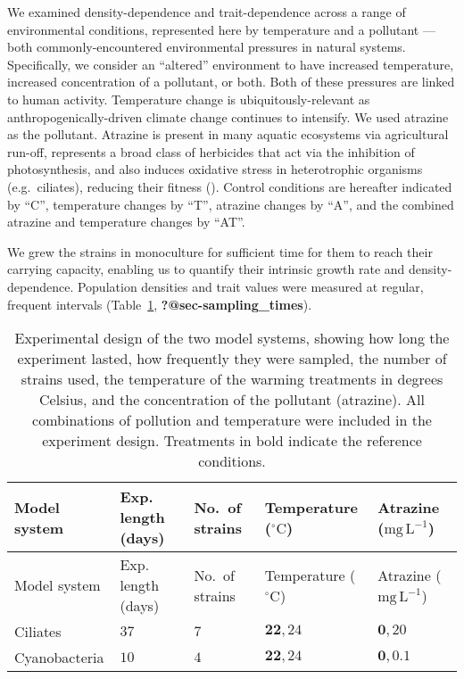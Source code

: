\documentclass[
  letterpaper,
  DIV=11,
  numbers=noendperiod]{scrartcl}
\begin{document}
We examined density-dependence and trait-dependence across a range of
environmental conditions, represented here by temperature and a
pollutant --- both commonly-encountered environmental pressures in
natural systems. Specifically, we consider an ``altered'' environment to
have increased temperature, increased concentration of a pollutant, or
both. Both of these pressures are linked to human activity. Temperature
change is ubiquitously-relevant as anthropogenically-driven climate
change continues to intensify. We used atrazine as the pollutant.
Atrazine is present in many aquatic ecosystems via agricultural run-off,
represents a broad class of herbicides that act via the inhibition of
photosynthesis, and also induces oxidative stress in heterotrophic
organisms (e.g.~ciliates), reducing their fitness
(). Control conditions are
hereafter indicated by ``C'', temperature changes by ``T'', atrazine
changes by ``A'', and the combined atrazine and temperature changes by
``AT''.

We grew the strains in monoculture for sufficient time for them to reach
their carrying capacity, enabling us to quantify their intrinsic growth
rate and density-dependence. Population densities and trait values were
measured at regular, frequent intervals
(Table~\ref{tbl-treatment-table}, \textbf{?@sec-sampling\_times}).

\begin{longtable}[]{@{}lllll@{}}
\caption{Experimental design of the two model systems, showing how long
the experiment lasted, how frequently they were sampled, the number of
strains used, the temperature of the warming treatments in degrees
Celsius, and the concentration of the pollutant (atrazine). All
combinations of pollution and temperature were included in the
experiment design. Treatments in bold indicate the reference
conditions.}\label{tbl-treatment-table}\tabularnewline
\toprule\noalign{}
Model system & Exp. length (days) & No.~of strains & Temperature
(\(\mathrm{^\circ C}\)) & Atrazine (\(\mathrm{mg\,L}^{-1}\)) \\
\midrule\noalign{}
\endfirsthead
\toprule\noalign{}
Model system & Exp. length (days) & No.~of strains & Temperature
(\(\mathrm{^\circ C}\)) & Atrazine (\(\mathrm{mg\,L}^{-1}\)) \\
\midrule\noalign{}
\endhead
\bottomrule\noalign{}
\endlastfoot
Ciliates & \(37\) & \(7\) & \(\mathbf{22}, 24\) & \(\mathbf{0}, 20\) \\
Cyanobacteria & \(10\) & \(4\) & \(\mathbf{22}, 24\) &
\(\mathbf{0}, 0.1\) \\
\end{longtable}
\end{document}
